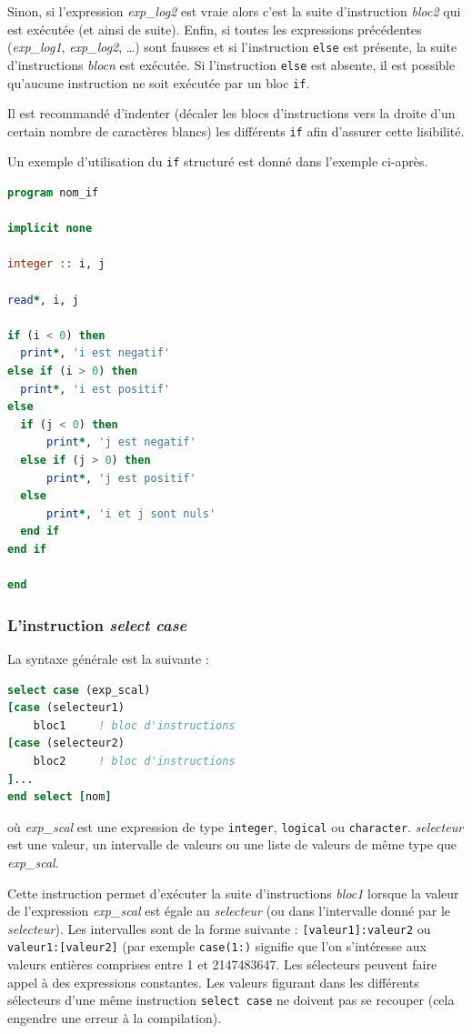 \documentclass[a4paper,twoside]{article}
\begin{document}
Sinon, si l'expression \emph{exp\_log2} est vraie alors c'est la suite d'instruction \emph{bloc2} qui est exécutée (et ainsi de suite). Enfin, si toutes les expressions précédentes (\emph{exp\_log1}, \emph{exp\_log2}, \ldots) sont fausses et si l'instruction \texttt{else} est présente, la suite d'instructions \emph{blocn} est exécutée. Si l'instruc\-tion \texttt{else} est absente, il est possible qu'aucune instruction ne soit exécutée par un bloc \texttt{if}.

\begin{remarque}
Il est recommandé d'indenter (décaler les blocs d'instructions vers la droite d'un certain nombre de caractères blancs) les différents \texttt{if} afin d'assurer cette lisibilité. 
\end{remarque}



Un exemple d'utilisation du \texttt{if} structuré est donné dans l'exemple ci-après. 
\begin{lstlisting}[language=Fortran]
program nom_if

implicit none

integer :: i, j

read*, i, j

if (i < 0) then
  print*, 'i est negatif'
else if (i > 0) then
  print*, 'i est positif'
else
  if (j < 0) then
      print*, 'j est negatif'
  else if (j > 0) then
      print*, 'j est positif'
  else
      print*, 'i et j sont nuls'
  end if
end if

end
\end{lstlisting}

\subsubsection{L'instruction \emph{select case}}

La syntaxe générale est la suivante : 
\begin{lstlisting}[language=Fortran]
select case (exp_scal) 
[case (selecteur1)
    bloc1     ! bloc d'instructions 
[case (selecteur2)
    bloc2     ! bloc d'instructions
]... 
end select [nom]
\end{lstlisting}
où \emph{exp\_scal} est une expression de type \texttt{integer}, \texttt{logical} ou \texttt{character}. \emph{selecteur} est une valeur, un intervalle de valeurs ou une liste de valeurs de même type que \emph{exp\_scal}.

Cette instruction permet d'exécuter la suite d'instructions \emph{bloc1} lorsque la valeur de l'expression \emph{exp\_scal} est égale au \emph{selecteur} (ou dans l'intervalle donné par le \emph{selecteur}). Les intervalles sont de la forme suivante : \texttt{[valeur1]:valeur2} ou \texttt{valeur1:[valeur2]} (par exemple \texttt{case(1:)} signifie que l'on s'intéresse aux valeurs entières comprises entre 1 et 2147483647. Les sélecteurs peuvent faire appel à des expressions constantes. Les valeurs figurant dans les différents sélecteurs d'une même instruction \texttt{select case} ne doivent pas se recouper (cela engendre une erreur à la compilation).
\end{document}

